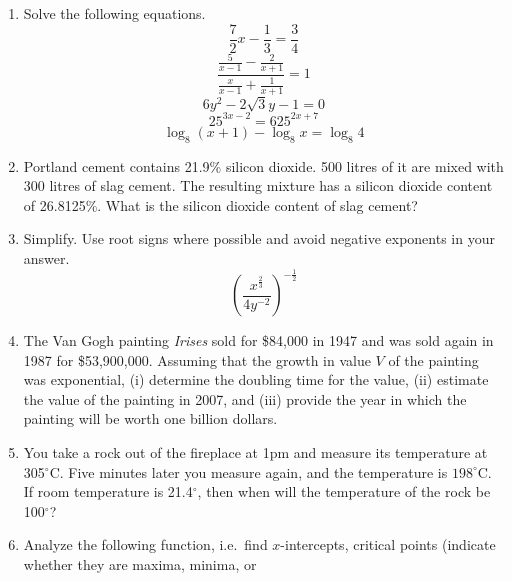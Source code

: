 \documentclass[11pt]{article}
\begin{document}
\begin{enumerate}
\item Solve the following equations.
  \begin{equation}
    \label{eq:thephohk}
    \frac{7}{2}x-\frac{1}{3}=\frac{3}{4}
  \end{equation}
  \begin{equation}
    \label{eq:uchoowai}
    \frac{\frac{5}{x-1}-\frac{2}{x+1}}{\frac{x}{x-1}+\frac{1}{x+1}}=1
  \end{equation}
  \begin{equation}
    \label{eq:eishahji}
    6y^{2}-2\sqrt{3}y-1=0
  \end{equation}
  \begin{equation}
    \label{eq:vohtovuj}
    25^{3x-2}=625^{2x+7}
  \end{equation}
  \begin{equation}
    \label{eq:laishedu}
    \log_{8}(x+1)-\log_{8}x=\log_{8}4
  \end{equation}
\item Portland cement contains 21.9\% silicon dioxide. 500 litres of
  it are mixed with 300 litres of slag cement. The resulting mixture
  has a silicon dioxide content of 26.8125\%. What is the silicon
  dioxide content of slag cement?
\item Simplify. Use root signs where possible and avoid negative
  exponents in your answer.
  \begin{equation}
    \label{eq:einicohx}
    \left(\frac{x^{\frac{2}{3}}}{4y^{-2}}\right)^{-\frac{1}{2}}
  \end{equation}
\item The Van Gogh painting \emph{Irises} sold for \$84,000 in 1947
  and was sold again in 1987 for \$53,900,000. Assuming that the
  growth in value $V$ of the painting was exponential, (i) determine the
  doubling time for the value, (ii) estimate the value of the painting
  in 2007, and (iii) provide the year in which the painting will be worth
  one billion dollars.
\item You take a rock out of the fireplace at 1pm and measure its
  temperature at 305$^{\circ}$C. Five minutes later you measure again,
  and the temperature is $198^{\circ}$C. If room temperature is
  21.4$^{\circ}$, then when will the temperature of the rock be
  100$^{\circ}$?
\item Analyze the following function, i.e.\ find $x$-intercepts,
  critical points (indicate whether they are maxima, minima, or

\end{enumerate}
\end{document}
